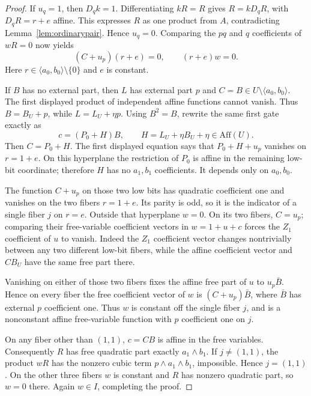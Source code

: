 \documentclass[11pt,a4paper]{article}
\newcommand{\Aff}{\mathrm{Aff}}
\begin{document}
\begin{proof}
If $u_q=1$, then $D_qk=1$. Differentiating $kR=R$ gives $R=kD_qR$, with $D_qR=r+e$ affine. This expresses $R$ as one product from $A$, contradicting Lemma~\ref{lem:ordinarypair}. Hence $u_q=0$. Comparing the $pq$ and $q$ coefficients of $wR=0$ now yields
\[
(C+u_p)(r+e)=0,\qquad (r+e)w=0.
\]
Here $r\in\langle a_0,b_0\rangle\setminus\{0\}$ and $e$ is constant.

If $B$ has no external part, then $L$ has external part $p$ and $C=B\in U\setminus\langle a_0,b_0\rangle$. The first displayed product of independent affine functions cannot vanish. Thus $B=B_U+p$, while $L=L_U+\eta p$. Using $B^2=B$, rewrite the same first gate exactly as
\[
c=(P_0+H)B,\qquad H=L_U+\eta B_U+\eta\in\Aff(U).
\]
Then $C=P_0+H$. The first displayed equation says that $P_0+H+u_p$ vanishes on $r=1+e$. On this hyperplane the restriction of $P_0$ is affine in the remaining low-bit coordinate; therefore $H$ has no $a_1,b_1$ coefficients. It depends only on $a_0,b_0$.

The function $C+u_p$ on those two low bits has quadratic coefficient one and vanishes on the two fibers $r=1+e$. Its parity is odd, so it is the indicator of a single fiber $j$ on $r=e$. Outside that hyperplane $w=0$. On its two fibers, $C=u_p$; comparing their free-variable coefficient vectors in $w=1+u+c$ forces the $Z_1$ coefficient of $u$ to vanish. Indeed the $Z_1$ coefficient vector changes nontrivially between any two different low-bit fibers, while the affine coefficient vector and $CB_U$ have the same free part there.

Vanishing on either of those two fibers fixes the affine free part of $u$ to $u_p\bar B$. Hence on every fiber the free coefficient vector of $w$ is $(C+u_p)\bar B$, where $\bar B$ has external $p$ coefficient one. Thus $w$ is constant off the single fiber $j$, and is a nonconstant affine free-variable function with $p$ coefficient one on $j$.

On any fiber other than $(1,1)$, $c=CB$ is affine in the free variables. Consequently $R$ has free quadratic part exactly $a_1\wedge b_1$. If $j\ne(1,1)$, the product $wR$ has the nonzero cubic term $p\wedge a_1\wedge b_1$, impossible. Hence $j=(1,1)$. On the other three fibers $w$ is constant and $R$ has nonzero quadratic part, so $w=0$ there. Again $w\in I$, completing the proof.
\end{proof}
\end{document}
